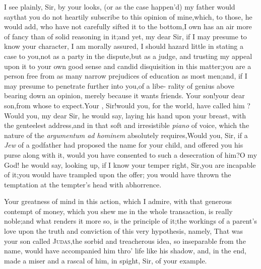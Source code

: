\documentclass{article}
\begin{document}
I see plainly, Sir, by your looks, (or as the case happen’d) my
father would say\tsk  that you do not heartily subscribe to this
opinion of mine,\tsk  which, to those, he would add, who have not
carefully sifted it to the bottom,\tsk  I own has an air more of
fancy than of solid reasoning in it;\tsh  and yet, my dear
Sir, if I may presume to know your character, I am morally assured,
I should hazard little in stating a case to you,\tsk not as a party in
the dispute,\tsk  but as a judge, and trusting my appeal upon it
to your own good sense and candid disquisition in this
matter;\tsh  you are a person free from as many narrow
prejudices of education as most men;\tsk  and, if I may presume to
penetrate further into you,\tsk  of a libe- rality of genius above
bearing down an opinion, merely because it wants friends. Your
son!\tsk  your dear son,\tsk  from whose  to expect.\tsk  Your ,
Sir!\tsk  would you, for the world, have called him\break
{}?\tsk  Would you, my dear Sir, he would say,
laying his hand upon your breast, with the genteelest
address,\tsk  and in that soft and irresistible \textit{piano} of
voice, which the nature of the \textit{argumentum ad hominem}
absolutely requires,\tsk  Would you, Sir, if a \textit{Jew} of a
godfather had proposed the name for your child, and offered you his
purse along with it, would you have consented to such a desecration
of him?\tsh  O my God! he would say, looking up, if I know
your temper right, Sir,\tsk  you are incapable of
it;\tsh  you would have trampled upon the offer;\tsk{} you
would have thrown the temptation at the tempter’s head with
abhorrence.

Your greatness of mind in this action, which I admire, with that
generous contempt of money, which you shew me in the whole
transaction, is really noble;\tsk\break  and what renders it more so, is
the principle of it;\tsk  the workings of a parent’s\break
love upon the truth and conviction of\break
this very hypothesis, namely, That
was your son called \textsc{Judas},\tsk  the sorbid and
treacherous idea, so inseparable from the name, would have
accompanied him\break
thro’ life like his shadow, and, in the\break
end, made a miser and a rascal of him,\break 
in spight, Sir, of your example.
\end{document}
